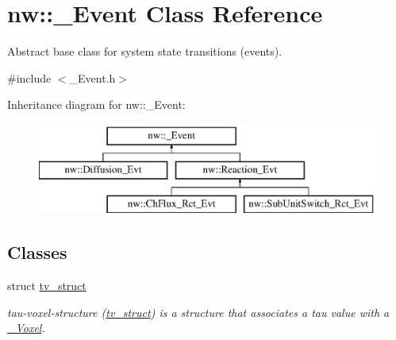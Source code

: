 \hypertarget{classnw_1_1___event}{\section{nw\+:\+:\+\_\+\+Event Class Reference}
\label{classnw_1_1___event}
}


Abstract base class for system state transitions (events).  




{\ttfamily \#include $<$\+\_\+\+Event.\+h$>$}

Inheritance diagram for nw\+:\+:\+\_\+\+Event\+:\begin{figure}[H]
\begin{center}
\leavevmode
\includegraphics[height=3.000000cm]{d8/d98/classnw_1_1___event}
\end{center}
\end{figure}
\subsection*{Classes}
\begin{DoxyCompactItemize}
\item 
struct \hyperlink{structnw_1_1___event_1_1tv__struct}{tv\+\_\+struct}
\begin{DoxyCompactList}\small\item\em tau-\/voxel-\/structure (\hyperlink{structnw_1_1___event_1_1tv__struct}{tv\+\_\+struct}) is a structure that associates a tau value with a \hyperlink{classnw_1_1___voxel}{\+\_\+\+Voxel}. \end{DoxyCompactList}\end{DoxyCompactItemize}
